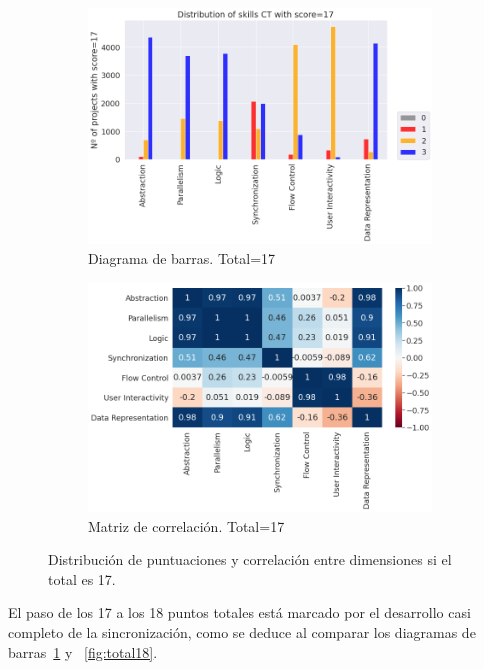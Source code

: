 \documentclass[a4paper, 12pt]{book}
\begin{document}
\begin{figure}[H]
    \centering
    \begin{subfigure}[h]{.49\textwidth} 
        \includegraphics[width=\textwidth]{img/distribucion_17_Scratch}
        \caption{Diagrama de barras. Total=17}
        \label{fig:total17}
    \end{subfigure}       
    \begin{subfigure}[h]{.49\textwidth} 
        \includegraphics[width=\textwidth]{img/corr_17_Scratch}
        \caption{Matriz de correlación. Total=17}
        \label{fig:corr17}
    \end{subfigure}
     \caption{Distribución de puntuaciones y correlación entre dimensiones si el total es 17.}
\end{figure}

El paso de los 17 a los 18 puntos totales está marcado por el desarrollo casi completo de la sincronización, como se deduce al comparar los diagramas de barras~\ref{fig:total17} y ~\ref{fig:total18}.
\end{document}
